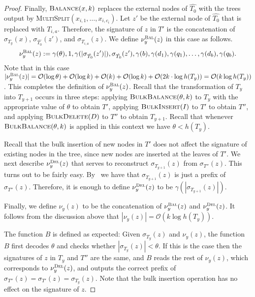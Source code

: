 \documentclass[kpfonts]{patmorin}
\newcommand{\Oh}{\mathcal{O}}
\begin{document}
\begin{proof}
  Finally, $\textsc{Balance}(x,k)$ replaces the external nodes of $\hat{T_0}$ with the trees output by \textsc{MultiSplit}$(x_{i,1},\ldots,x_{i,c_i})$.
  Let $z'$ be the external node of $\hat{T_0}$ that is replaced with $T_{i,a}$.
  Therefore, the signature of $z$ in $T'$ is the concatenation of $\sigma_{T_y}(x)$, $\sigma_{\hat{T_0}}(z')$, and $\sigma_{T_{i,a}}(z)$.
  We define $\nu^{\textsc{Bal}}_y(z)$ in this case as follows.
    \[
  \nu^{\textsc{Bal}}_y(z) := \gamma(\theta),1,\gamma(|\sigma_{\hat{T_0}}(z')|),\sigma_{\hat{T_0}}(z'),\gamma(b),
  \gamma(d_1),\gamma(q_1),\ldots,\gamma(d_b),\gamma(q_b).
  \]
  Note that in this case $|\nu^{\textsc{Bal}}_y(z)|=\Oh(\log\theta) + \Oh(\log k) + \Oh(k) + \Oh(\log k) + \Oh(2k\cdot\log h(T_y))=\Oh(k\log h(T_y))$.
  This completes the definition of $\nu^{\textsc{Bal}}_y(z)$.  Recall that the transformation of $T_{y}$ into $T_{y+1}$ occurs in three steps:
  applying $\textsc{BulkBalance}(\theta,k)$ to $T_y$ with the appropriate value of $\theta$ to obtain $T'$,
  applying $\textsc{BulkInsert}(I)$ to $T'$ to obtain $T''$, and
  applying $\textsc{BulkDelete}(D)$ to $T''$ to obtain $T_{y+1}$.
  Recall that whenever $\textsc{BulkBalance}(\theta,k)$ is applied in this context we have $\theta < h(T_y)$.


 Recall that the bulk insertion of new nodes in $T'$ does not affect the signature of existing nodes in the tree, since new nodes are inserted at the leaves of $T'$. We next describe $\nu^{\textsc{Del}}_y(z)$ that serves to reconstruct $\sigma_{T_{y+1}}(z)$ from $\sigma_{T''}(z)$.
  This turns out to be fairly easy.
  By~ we have that $\sigma_{T_{y+1}}(z)$ is just a prefix of $\sigma_{T''}(z)$.
  Therefore, it is enough to define $\nu^{\textsc{Del}}_y(z)$ to be $\gamma(|\sigma_{T_{y+1}}(z)|)$.

  Finally, we define $\nu_y(z)$ to be the concatenation of $\nu^{\textsc{Bal}}_y(z)$ and $\nu^{\textsc{Del}}_y(z)$.
  It follows from the discussion above that $|\nu_y(z)| = \Oh(k\log h(T_y))$.

  The function $B$ is defined as expected:
  Given $\sigma_{T_{y}}(z)$ and $\nu_y(z)$, the function $B$ first decodes $\theta$ and checks whether $|\sigma_{T_y}(z)| < \theta$. If this is the case then the signatures of $z$ in $T_{y}$ and $T''$ are the same, and $B$ reads the rest of $\nu_y(z)$, which corresponds to $\nu^{\textsc{Del}}_y(z)$, and outputs the correct prefix of $\sigma_{T''}(z) = \sigma_{T'}(z) =\sigma_{T_{y}}(z)$.
  Note that the bulk insertion operation has no effect on the signature of $z$.


\end{proof}
\end{document}
